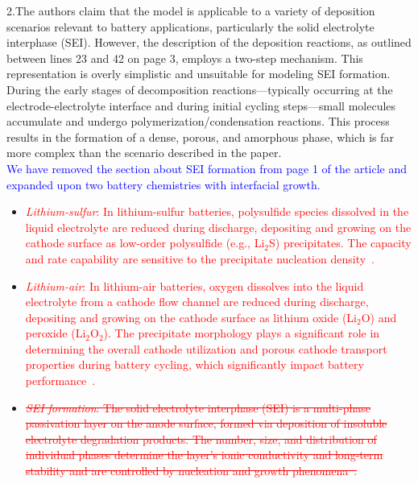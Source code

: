 \documentclass[12 pt]{article}    %
\begin{document}
\noindent2.The authors claim that the model is applicable to a variety of deposition scenarios relevant to battery applications, particularly the solid electrolyte interphase (SEI). However, the description of the deposition reactions, as outlined between lines 23 and 42 on page 3, employs a two-step mechanism. This representation is overly simplistic and unsuitable for modeling SEI formation. During the early stages of decomposition reactions—typically occurring at the electrode-electrolyte interface and during initial cycling steps—small molecules accumulate and undergo polymerization/condensation reactions. This process results in the formation of a dense, porous, and amorphous phase, which is far more complex than the scenario described in the paper. \\

\noindent\textcolor{blue}{We have removed the section about SEI formation from page 1 of the article and expanded upon two battery chemistries with interfacial growth.} \\

    \begin{itemize}
        \item \textcolor{red}{\textit{Lithium-sulfur}: In lithium-sulfur batteries, polysulfide species dissolved in the liquid electrolyte are reduced during discharge, depositing and growing on the cathode surface as low-order polysulfide (e.g., Li$_2$S) precipitates. The capacity and rate capability are sensitive to the precipitate nucleation density~\cite{bib:Li-S_deposition,bib:Li-S_deposition_2,bib:Model_ex_8}.}
               
        \item \textcolor{red}{\textit{Lithium-air}: In lithium-air batteries, oxygen dissolves into the liquid electrolyte from a cathode flow channel are reduced during discharge, depositing and growing on the cathode surface as lithium oxide (Li$_2$O) and peroxide (Li$_2$O$_2$). The precipitate morphology plays a significant role in determining the overall cathode utilization and porous cathode transport properties during battery cycling, which significantly impact battery performance~\cite{bib:Li-O_deposition,bib:Li-air_deposition}.}
        
        \item \textcolor{red}{\sout{\textit{SEI formation}: The solid electrolyte interphase (SEI) is a multi-phase passivation layer on the anode surface, formed via deposition of insoluble electrolyte degradation products. The number, size, and distribution of individual phases determine the layer's ionic conductivity and long-term stability and are controlled by nucleation and growth phenomena~\cite{bib:SEI_deposition,bib:SEI_deposition_2,bib:SEI_deposition_3}.}}
    \end{itemize}
\end{document}
